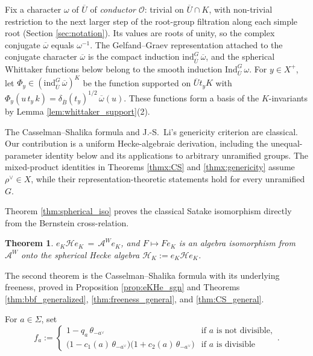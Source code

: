 \documentclass[12pt]{article}
\numberwithin{equation}{section}
\theoremstyle{definition}
\theoremstyle{remark}
\theoremstyle{plain}
\newtheorem{thmx}{Theorem}
\begin{document}
Fix a character $\omega$ of $\overline{U}$ of \emph{conductor $\mathcal{O}$}: trivial on $\overline{U} \cap K$, with non-trivial restriction to the next larger step of the root-group filtration along each simple root (Section \ref{sec:notation}). Its values are roots of unity, so the complex conjugate $\overline{\omega}$ equals $\omega^{-1}$. The Gelfand--Graev representation attached to the conjugate character $\overline{\omega}$ is the compact induction $\mathrm{ind}_{\overline{U}}^{G}\,\overline{\omega}$, and the spherical Whittaker functions below belong to the smooth induction $\mathrm{Ind}_{\overline{U}}^{G}\,\omega$. For $y \in X^+$, let $\Phi_y \in (\mathrm{ind}_{\overline{U}}^{G}\,\overline{\omega})^K$ be the function supported on $\overline{U}t_yK$ with $\Phi_y(u\,t_y\,k) = \delta_{\overline{B}}(t_y)^{1/2}\,\overline{\omega}(u)$. These functions form a basis of the $K$-invariants by Lemma \ref{lem:whittaker_support}(2).

The Casselman--Shalika formula and J.-S.\ Li's genericity criterion are classical. Our contribution is a uniform Hecke-algebraic derivation, including the unequal-parameter identity below and its applications to arbitrary unramified groups. The mixed-product identities in Theorems \ref{thmx:CS} and \ref{thmx:genericity} assume $\rho^\vee \in X$, while their representation-theoretic statements hold for every unramified $G$.

Theorem \ref{thm:spherical_iso} proves the classical Satake isomorphism directly from the Bernstein cross-relation.

\begin{thmx}\label{thmx:satake}
$e_{K}\mathcal{H}e_{K} \,=\, \mathcal{A}^{W}e_{K}$, and $F \mapsto Fe_{K}$ is an algebra isomorphism from $\mathcal{A}^{W}$ onto the spherical Hecke algebra $\mathcal{H}_{K} := e_{K}\mathcal{H}e_{K}$.
\end{thmx}

The second theorem is the Casselman--Shalika formula with its underlying freeness, proved in Proposition \ref{prop:eKHe_sgn} and Theorems \ref{thm:bbf_generalized}, \ref{thm:freeness_general}, and \ref{thm:CS_general}.

For $a\in\Sigma$, set
$$f_a := \begin{cases} 1 - q_a\,\theta_{-a^\vee} & \text{if } a \text{ is not divisible},\\[2pt] \big(1 - c_1(a)\,\theta_{-a^\vee}\big)\big(1 + c_2(a)\,\theta_{-a^\vee}\big) & \text{if } a \text{ is divisible}\end{cases}.$$
\end{document}
